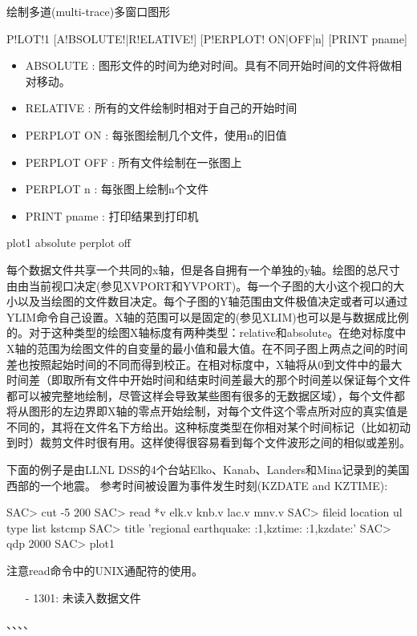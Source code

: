 \label{cmd:plot1}

绘制多道(multi-trace)多窗口图形

\begin{SACSTX}
P!LOT!1 [A!BSOLUTE!|R!ELATIVE!] [P!ERPLOT! ON|OFF|n] [PRINT pname]
\end{SACSTX}

\begin{itemize}
\item ABSOLUTE : 图形文件的时间为绝对时间。具有不同开始时间的文件将做相对移动。
\item RELATIVE : 所有的文件绘制时相对于自己的开始时间
\item PERPLOT ON : 每张图绘制几个文件，使用n的旧值 
\item PERPLOT OFF : 所有文件绘制在一张图上 
\item PERPLOT n : 每张图上绘制n个文件 
\item PRINT pname : 打印结果到打印机 
\end{itemize}

\begin{SACDFT}
plot1 absolute perplot off
\end{SACDFT}

每个数据文件共享一个共同的x轴，但是各自拥有一个单独的y轴。绘图的总尺寸由由当前视口决定(参见XVPORT和YVPORT)。每一个子图的大小这个视口的大小以及当绘图的文件数目决定。每个子图的Y轴范围由文件极值决定或者可以通过YLIM命令自己设置。X轴的范围可以是固定的(参见XLIM)也可以是与数据成比例的。对于这种类型的绘图X轴标度有两种类型：relative和absolute。在绝对标度中X轴的范围为绘图文件的自变量的最小值和最大值。在不同子图上两点之间的时间差也按照起始时间的不同而得到校正。在相对标度中，X轴将从0到文件中的最大时间差（即取所有文件中开始时间和结束时间差最大的那个时间差以保证每个文件都可以被完整地绘制，尽管这样会导致某些图有很多的无数据区域），每个文件都将从图形的左边界即X轴的零点开始绘制，对每个文件这个零点所对应的真实值是不同的，其将在文件名下方给出。这种标度类型在你相对某个时间标记（比如初动到时）裁剪文件时很有用。这样使得很容易看到每个文件波形之间的相似或差别。

下面的例子是由LLNL DSS的4个台站Elko、Kanab、Landers和Mina记录到的美国西部的一个地震。
参考时间被设置为事件发生时刻(KZDATE and KZTIME):
\begin{SACCode}
SAC> cut -5 200
SAC> read *v
 elk.v knb.v lac.v mnv.v
SAC> fileid location ul type list kstcmp
SAC> title 'regional earthquake:  :1,kztime:  :1,kzdate:'
SAC> qdp 2000
SAC> plot1
\end{SACCode}
注意read命令中的UNIX通配符的使用。

\begin{itemize}
\item[-]1301: 未读入数据文件
\end{itemize}

、、、、
